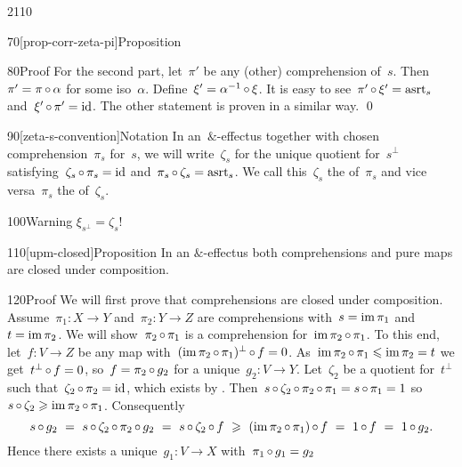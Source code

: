 \begin{parsec}{2110}
\begin{point}{70}[prop-corr-zeta-pi]{Proposition}
\begin{point}{80}{Proof}
For the second part,
let~$\pi'$ be any (other) comprehension of~$s$.
Then~$\pi' = \pi \mathop{\circ} \alpha$ for some iso~$\alpha$.
Define~$\xi' = \alpha^{-1} \mathop{\circ} \xi$.
It is easy to see~$\pi' \mathop{\circ} \xi' = \mathrm{asrt}_s$
and~$\xi' \mathop{\circ} \pi' = \operatorname{id}$.
The other statement is proven in a similar way. \qed
\end{point}
\begin{point}{90}[zeta-s-convention]{Notation}%
In an~$\&$-effectus
    together with chosen comprehension~$\pi_s$ for~$s$,
    we will write~$\zeta_s$
    for the unique quotient for~$s^\perp$
    satisfying~$\zeta_s \mathop{\circ} \pi_s = \operatorname{id}$
    and~$\pi_s \mathop{\circ} \zeta_s = \mathrm{asrt}_s$.
We call this~$\zeta_s$
    the  of~$\pi_s$
    and vice versa~$\pi_s$ the 
    of~$\zeta_s$.
\end{point}
\begin{point}{100}{Warning}%
    $\xi_{s^\perp} = \zeta_s$!
\end{point}
\end{point}
\begin{point}{110}[upm-closed]{Proposition}%
In an $\&$-effectus
    both comprehensions and pure maps are closed under composition.
\begin{point}{120}{Proof}%
We will first prove that comprehensions are closed under composition.
Assume~$\pi_1 \colon X \to Y$
    and~$\pi_2 \colon Y \to Z$
    are comprehensions with~$s = \operatorname{im} \pi_1$
    and~$t = \operatorname{im} \pi_2$.
We will show~$\pi_2 \mathop{\circ} \pi_1$
    is a comprehension for~$\operatorname{im} \pi_2 \mathop{\circ} \pi_1$.
To this end, let~$f\colon V\to Z$ be any map
with~$(\operatorname{im} \pi_2 \mathop{\circ} \pi_1)^\perp \mathop{\circ} f = 0$.
As~$\operatorname{im} \pi_2 \mathop{\circ} \pi_1 \leqslant \operatorname{im} \pi_2 = t$
    we get~$t^\perp \mathop{\circ} f = 0$,
    so~$f = \pi_2 \mathop{\circ} g_2$ for a unique~$g_2\colon V \to Y$.
Let~$\zeta_2$ be a quotient for~$t^\perp$
such that~$\zeta_2 \mathop{\circ} \pi_2 = \operatorname{id}$,
which exists by .
Then~$s \mathop{\circ} \zeta_2 \mathop{\circ} \pi_2 \mathop{\circ} \pi_1
            = s \mathop{\circ} \pi_1 = 1$
            so~$s \mathop{\circ} \zeta_2 \geqslant \operatorname{im} \pi_2 \mathop{\circ} \pi_1$.
Consequently
\begin{equation*}
    s \mathop{\circ} g_2 \ =\  s \mathop{\circ} \zeta_2 \mathop{\circ} \pi_2 \mathop{\circ} g_2
        \ =\  s \mathop{\circ} \zeta_2 \mathop{\circ} f
        \ \geqslant\   (\operatorname{im} \pi_2 \mathop{\circ} \pi_1) \mathop{\circ} f \ =\  1 \mathop{\circ} f
                \ =\  1 \mathop{\circ} g_2.
\end{equation*}
Hence there exists a unique~$g_1\colon V \to X$
    with~$\pi_1 \mathop{\circ} g_1 = g_2$

\end{point}
\end{point}
\end{parsec}
